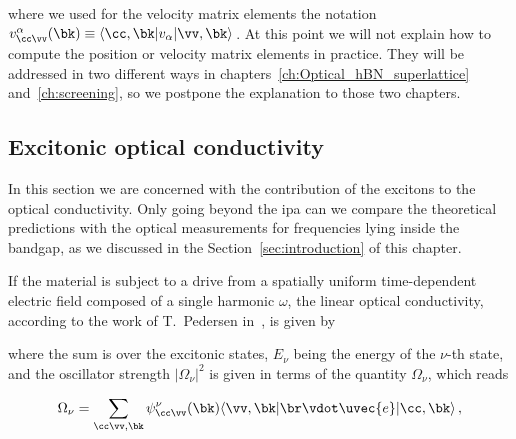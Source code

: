 \noindent where we used for the velocity matrix elements the notation $v^{\alpha}_{\cc  \vv }(\bk) \equiv \langle \cc ,\bk|v_{\alpha}|\vv,\bk\rangle$\,.
At this point we will not explain how to compute the position or velocity matrix elements in practice.
They will be addressed in two different ways in chapters~\ref{ch:Optical_hBN_superlattice} and~\ref{ch:screening}, so we postpone the explanation to those two chapters.


\subsection{Excitonic optical conductivity}
\label{subsec:excitonic_conductivity}

In this section we are concerned with the contribution of the excitons to the optical conductivity.
Only going beyond the \gls{ipa} can we compare the theoretical predictions with the optical measurements for frequencies lying inside the bandgap, as we discussed in the Section~\ref{sec:introduction} of this chapter.

If the material is subject to a drive from a spatially uniform time-dependent electric field composed of a single harmonic $\omega$, the linear optical conductivity, according to the work of T.~Pedersen in~\cite{Pedersen_2015}, is given by


\noindent where the sum is over the excitonic states, $E_{\nu}$ being the energy of the $\nu$-th state, and the oscillator strength $|\Omega_{\nu}|^2$ is given in terms of the quantity $\Omega_\nu$, which reads

\begin{equation}
    \label{eq:Berry_curvature_definition}
    \Omega_{\nu} = \sum_{\cc \vv,\bk} \psi^{\nu}_{\cc  \vv } (\bk) \langle \vv, \bk | \br \vdot \uvec{e} | \cc , \bk \rangle\,,
\end{equation}

